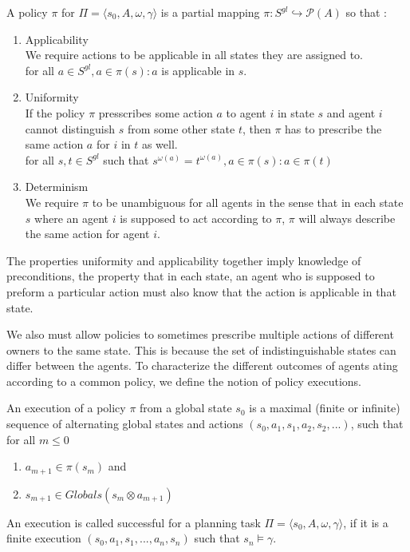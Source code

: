 A policy $\pi$ for $\Pi = \langle s_0, A, \omega, \gamma \rangle$ is a partial mapping $\pi: S^{gl} \hookrightarrow \mathcal{P}(A)$ so that :
\begin{enumerate}
  \item Applicability\\
    We require actions to be applicable in all states they are assigned to. \\
    for all $a \in S^{gl}, a \in \pi(s): a$ is applicable in $s$.
  \item Uniformity \\
    If the policy $\pi$ presscribes some action $a$ to agent $i$ in state $s$ and agent $i$ cannot distinguish $s$ from some other state $t$, then $\pi$ has to prescribe the same action $a$ for $i$ in $t$ as well. \\
    for all $s,t \in S^{gl} $ such that $ s^{\omega(a)} = t^{\omega(a)}, a \in \pi(s): a \in \pi(t)$
  \item Determinism \\
    We require $\pi$ to be unambiguous for all agents in the sense that in each state $s$ where an agent $i$ is supposed to act according to $\pi$, $\pi$ will always describe the same action for agent $i$.
\end{enumerate}

The properties uniformity and applicability together imply knowledge of preconditions, the property that in each state, an agent who is supposed to preform a particular action must also know that the action is applicable in that state.

We also must allow policies to sometimes prescribe multiple actions of different owners to the same state. This is because the set of indistinguishable states can differ between the agents. To characterize the different outcomes of agents ating according to a common policy, we define the notion of policy executions.

An execution of a policy $\pi$ from a global state $s_0$ is a maximal (finite or infinite) sequence of alternating global states and actions $(s_0, a_1, s_1, a_2, s_2,...)$, such that for all $ m \leq 0$
\begin{enumerate}
  \item $a_{m+1} \in \pi(s_m)$ and
  \item $s_{m+1} \in Globals(s_m \otimes a_{m+1})$
\end{enumerate}
An execution is called successful for a planning task $\Pi = \langle s_0, A, \omega, \gamma \rangle$, if it is a finite execution $(s_0, a_1, s_1,...,a_n, s_n)$ such that $s_n \models \gamma$.

